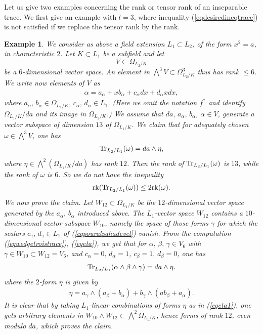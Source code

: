\documentclass[10pt]{article}
\newtheorem{ex}[theo]{Example}
\begin{document}
Let us give two examples concerning the   rank or tensor rank of an inseparable trace. We first give an example with $l=3$, where inequality (\ref{eqdesiredineqtrace}) is not satisfied if we replace the tensor rank by the rank.
\begin{ex} \label{example}  {\rm We consider as above a field extension $ L_1\subset L_2$, of the form  $x^2=a$, in characteristic $2$. Let $K\subset L_1$ be a subfield and let
$$V\subset \Omega_{L_2/K}$$ be a $6$-dimensional vector space. An element in $\bigwedge^3V\subset \Omega_{L_2/K}^3$ thus has rank $\leq 6$. We write now elements of
$V$ as \begin{eqnarray}\label{eqpouralpahadevel} \alpha=a_\alpha+x b_\alpha+ c_\alpha dx+ d_\alpha xdx,\end{eqnarray}
 where $a_\alpha,\,b_\alpha\in \Omega_{L_1/K},\,c_\alpha,\,d_\alpha\in L_1$. (Here we omit the notation $f^*$ and identify $\Omega_{L_1/K}/da$ and its image in $\Omega_{L_2/K}$.)  We assume that  $da,\,a_\alpha,\,b_\alpha$, $\alpha\in V$, generate a vector subspace of dimension $13$ of $\Omega_{L_1/K}$. We  claim that for adequately chosen
 $\omega\in  \bigwedge^3V$, one has
 $${\rm Tr}_{L_2/L_1}(\omega)=da\wedge \eta,$$
 where $\eta\in\bigwedge^2(\Omega_{L_1/K}/da)$ has rank $12$. Then the rank of ${\rm Tr}_{L_2/L_1}(\omega)$ is $13$, while the rank of $\omega$ is $6$. So we do not have the inequality
 $${\rm rk}({\rm Tr}_{L_2/L_1}(\omega))\leq 2{\rm rk}(\omega).$$
We now prove the claim. Let $W_{12}\subset \Omega_{L_1/K}$ be the $12$-dimensional vector   space generated by the $a_\alpha,\,b_\alpha$ introduced  above.  The $L_1$-vector space $W_{12}$ contains a $10$-dimensional vector subspace $W_{10}$, namely the space of those forms $\gamma$ for which the scalars $c_\gamma,\,d_\gamma\in L_1 $ of (\ref{eqpouralpahadevel}) vanish. From the computation (\ref{eqwedgetroistrace}), (\ref{eqeta}),
we get that for $\alpha,\,\beta,\,\gamma\in V_6$ with $\gamma\in W_{10}\subset W_{12}=V_6$, and $c_\alpha=0,\,d_\alpha=1$, $c_\beta=1,\,d_\beta=0$, one has
\begin{eqnarray}\label{eqwedgetroistracenouveau} {\rm Tr}_{L_2/L_1}(\alpha\wedge\beta\wedge \gamma)=da\wedge \eta .
\end{eqnarray}
where the $2$-form $\eta$ is given by
\begin{eqnarray}\label{eqeta1}\eta=a_\gamma\wedge(a_\beta+b_\alpha)+b_\gamma\wedge(ab_\beta+a_\alpha).\end{eqnarray}
It is clear that by taking $L_1$-linear combinations of forms $\eta$ as in (\ref{eqeta1}), one gets arbitrary elements in $W_{10}\wedge W_{12}\subset \bigwedge^2\Omega_{L_1/K}$, hence forms of rank $12$, even modulo $da$, which proves the claim.}
\end{ex}
\end{document}
